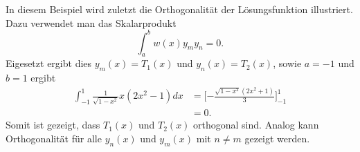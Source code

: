 \begin{beispiel}
	In diesem Beispiel wird zuletzt die Orthogonalität der Lösungsfunktion
	illustriert.
	Dazu verwendet man das Skalarprodukt
	\[
		\int_{a}^{b} w(x) y_m y_n = 0.
	\]
	Eigesetzt ergibt dies $y_m(x) = T_1(x)$ und $y_n(x) = T_2(x)$, sowie $a=-1$ und $b = 1$
	ergibt
	\[
	\begin{aligned}
	\int_{-1}^{1} \frac{1}{\sqrt{1-x^2}} x (2x^2-1) dx &=
	\lbrack - \frac{\sqrt{1-x^2}(2x^2+1)}{3}\rbrack_{-1}^{1}\\
	&= 0.
	\end{aligned}
	\]
	Somit ist gezeigt, dass $T_1(x)$ und $T_2(x)$ orthogonal sind.
	Analog kann Orthogonalität für alle $y_n(x)$ und $y_m(x)$ mit $n \ne m$ gezeigt werden.
\end{beispiel}
